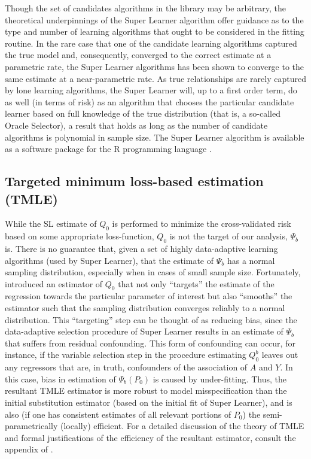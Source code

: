 Though the set of candidates algorithms in the library may be arbitrary, the
theoretical underpinnings of the Super Learner algorithm offer guidance as to
the type and number of learning algorithms that ought to be considered in the
fitting routine. In the rare case that one of the candidate learning algorithms
captured the true model and, consequently, converged to the correct estimate at
a parametric rate, the Super Learner algorithms has been shown to converge to
the same estimate at a near-parametric rate. As true relationships are rarely
captured by lone learning algorithms, the Super Learner will, up to a first
order term, do as well (in terms of risk) as an algorithm that chooses the
particular candidate learner based on full knowledge of the true distribution
(that is, a so-called Oracle Selector), a result that holds as long as the
number of candidate algorithms is polynomial in sample size. The Super Learner
algorithm is available as a software package \cite{van2007super} for the R
programming language \cite{R}.

\subsection{Targeted minimum loss-based estimation (TMLE)}\label{tmle}

While the SL estimate of $Q_0$ is performed to minimize the cross-validated
risk based on some appropriate loss-function, $Q_0$ is not the target of our
analysis,  $\Psi_b$ is. There is no guarantee that, given a set of highly
data-adaptive learning algorithms (used by Super Learner), that the estimate of
$\Psi_b$ has a normal sampling distribution, especially when in cases of small
sample size. Fortunately, \cite{van2011targeted} introduced an estimator of
$Q_0$ that not only ``targets'' the estimate of the regression towards the
particular parameter of interest but also ``smooths'' the estimator such that
the sampling distribution converges reliably to a normal distribution. This
``targeting'' step can be thought of as reducing bias, since the data-adaptive
selection procedure of Super Learner results in an estimate of $\Psi_b$ that
suffers from residual confounding. This form of confounding can occur, for
instance, if the variable selection step in the procedure estimating $Q^b_0$
leaves out any regressors that are, in truth, confounders of the association of
$A$ and $Y$. In this case, bias in estimation of $\Psi_b(P_0)$ is caused by
under-fitting.  Thus, the resultant TMLE estimator is more robust to model
misspecification than the initial substitution estimator (based on the initial
fit of Super Learner), and is also (if one has consistent estimates of all
relevant portions of $P_0$) the semi-parametrically (locally) efficient. For a
detailed discussion of the theory of TMLE and formal justifications of the
efficiency of the resultant estimator, consult the appendix of
\cite{van2011targeted}.

